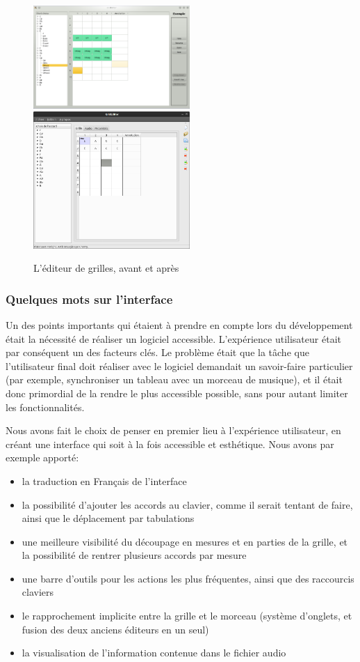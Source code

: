 \begin{figure}[H]
\begin{center}
\includegraphics[width=225px]{ancien_editeur.png}
\includegraphics[width=225px]{nouveau_editeur.png}
\caption{L'éditeur de grilles, avant et après}
\label{av_ap_editeur}
\end{center}
\end{figure}


\subsubsection*{Quelques mots sur l'interface}

Un des points importants qui étaient à prendre en compte lors du développement était la nécessité de réaliser un logiciel accessible. L'expérience utilisateur était par conséquent un des facteurs clés. Le problème était que la tâche que l'utilisateur final doit réaliser avec le logiciel demandait un savoir-faire particulier (par exemple, synchroniser un tableau avec un morceau de musique), et il était donc primordial de la rendre le plus accessible possible, sans pour autant limiter les fonctionnalités.

Nous avons fait le choix de penser en premier lieu à l'expérience utilisateur, en créant une interface qui soit à la fois accessible et esthétique. Nous avons par exemple apporté:
\begin{itemize}
 \item la traduction en Français de l'interface
 \item la possibilité d'ajouter les accords au clavier, comme il serait tentant de faire, ainsi que le déplacement par tabulations
 \item une meilleure visibilité du découpage en mesures et en parties de la grille, et la possibilité de rentrer plusieurs accords par mesure
 \item une barre d'outils pour les actions les plus fréquentes, ainsi que des raccourcis claviers
 \item le rapprochement implicite entre la grille et le morceau (système d'onglets, et fusion des deux anciens éditeurs en un seul)
 \item la visualisation de l'information contenue dans le fichier audio
\end{itemize}

